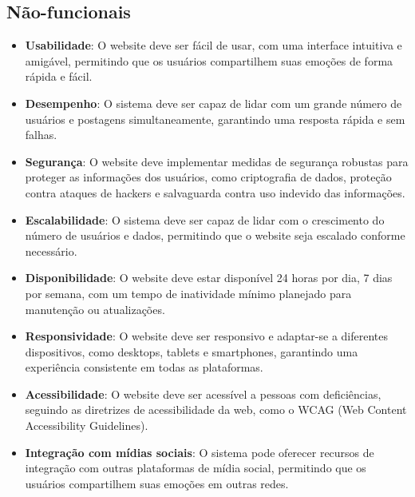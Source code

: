 \documentclass[12pt]{article}
\begin{document}
\subsection{Não-funcionais}
\begin{itemize}
  \item \textbf{Usabilidade}: O website deve ser fácil de usar, com uma interface intuitiva e amigável, permitindo que os usuários compartilhem suas emoções de forma rápida e fácil.
  \item \textbf{Desempenho}: O sistema deve ser capaz de lidar com um grande número de usuários e postagens simultaneamente, garantindo uma resposta rápida e sem falhas.
  \item \textbf{Segurança}: O website deve implementar medidas de segurança robustas para proteger as informações dos usuários, como criptografia de dados, proteção contra ataques de hackers e salvaguarda contra uso indevido das informações.
  \item \textbf{Escalabilidade}: O sistema deve ser capaz de lidar com o crescimento do número de usuários e dados, permitindo que o website seja escalado conforme necessário.
  \item \textbf{Disponibilidade}: O website deve estar disponível 24 horas por dia, 7 dias por semana, com um tempo de inatividade mínimo planejado para manutenção ou atualizações.
  \item \textbf{Responsividade}: O website deve ser responsivo e adaptar-se a diferentes dispositivos, como desktops, tablets e smartphones, garantindo uma experiência consistente em todas as plataformas.
  \item \textbf{Acessibilidade}: O website deve ser acessível a pessoas com deficiências, seguindo as diretrizes de acessibilidade da web, como o WCAG (Web Content Accessibility Guidelines).
  \item \textbf{Integração com mídias sociais}: O sistema pode oferecer recursos de integração com outras plataformas de mídia social, permitindo que os usuários compartilhem suas emoções em outras redes.
\end{itemize}
\end{document}
